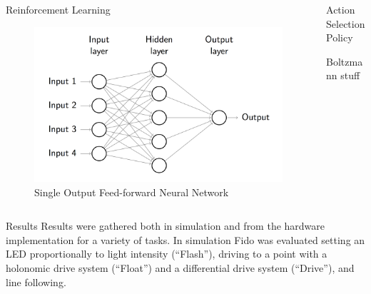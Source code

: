 \documentclass[final]{beamer}
\newlength{\onecolwid}
\newlength{\twocolwid}
\begin{document}
\begin{frame}[t]
\begin{columns}[t]
\begin{column}{\twocolwid}
\begin{columns}[t,totalwidth=\twocolwid]
\begin{column}{\onecolwid}\begin{block}{Reinforcement Learning}

	\begin{figure}
		\centering
		\includegraphics[width=.8\linewidth]{Figures/FeedForwardRendered}
		\caption{Single Output Feed-forward Neural Network}
		\label{fig:feedforward}
	\end{figure}

\end{block}\end{column}

\begin{column}{\onecolwid}\begin{block}{Action Selection Policy}
	
	Boltzmann stuff

\end{block}\end{column} 

\end{columns} 

	\begin{block}{Results}
		Results were gathered both in simulation and from the hardware implementation for a variety of tasks.  In simulation Fido was evaluated setting an LED proportionally to light intensity (``Flash''), driving to a point with a holonomic drive system (``Float'') and a differential drive system (``Drive''), and line following.


\end{block}
\end{column}
\end{columns}
\end{frame}
\end{document}
